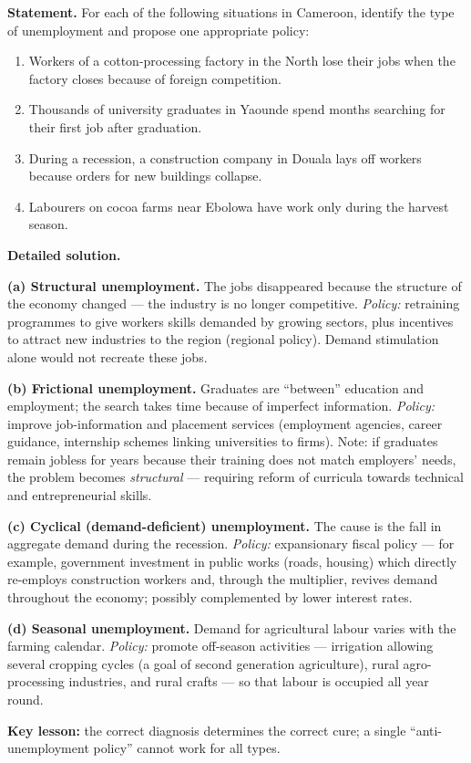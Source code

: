 \documentclass[11pt]{article}
\begin{document}
\begin{exoresolu}
\textbf{Statement.} For each of the following situations in Cameroon, identify the type of unemployment and propose one appropriate policy:
\begin{enumerate}
\item[(a)] Workers of a cotton-processing factory in the North lose their jobs when the factory closes because of foreign competition.
\item[(b)] Thousands of university graduates in Yaounde spend months searching for their first job after graduation.
\item[(c)] During a recession, a construction company in Douala lays off workers because orders for new buildings collapse.
\item[(d)] Labourers on cocoa farms near Ebolowa have work only during the harvest season.
\end{enumerate}
\tcblower
\textbf{Detailed solution.}

\textbf{(a) Structural unemployment.} The jobs disappeared because the structure of the economy changed — the industry is no longer competitive. \emph{Policy:} retraining programmes to give workers skills demanded by growing sectors, plus incentives to attract new industries to the region (regional policy). Demand stimulation alone would not recreate these jobs.

\textbf{(b) Frictional unemployment.} Graduates are ``between'' education and employment; the search takes time because of imperfect information. \emph{Policy:} improve job-information and placement services (employment agencies, career guidance, internship schemes linking universities to firms). Note: if graduates remain jobless for years because their training does not match employers' needs, the problem becomes \emph{structural} — requiring reform of curricula towards technical and entrepreneurial skills.

\textbf{(c) Cyclical (demand-deficient) unemployment.} The cause is the fall in aggregate demand during the recession. \emph{Policy:} expansionary fiscal policy — for example, government investment in public works (roads, housing) which directly re-employs construction workers and, through the multiplier, revives demand throughout the economy; possibly complemented by lower interest rates.

\textbf{(d) Seasonal unemployment.} Demand for agricultural labour varies with the farming calendar. \emph{Policy:} promote off-season activities — irrigation allowing several cropping cycles (a goal of second generation agriculture), rural agro-processing industries, and rural crafts — so that labour is occupied all year round.

\textbf{Key lesson:} the correct diagnosis determines the correct cure; a single ``anti-unemployment policy'' cannot work for all types.
\end{exoresolu}
\end{document}
